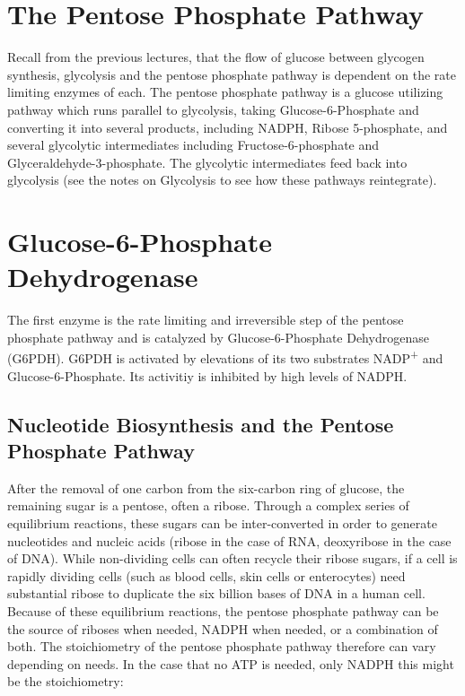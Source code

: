 \documentclass{tufte-handout}
\begin{document}
\section{The Pentose Phosphate Pathway}

Recall from the previous lectures, that the flow of glucose between glycogen synthesis, glycolysis and the pentose phosphate pathway is dependent on the rate limiting enzymes of each.  The pentose phosphate pathway is a glucose utilizing pathway which runs parallel to glycolysis, taking Glucose-6-Phosphate and converting it into several products, including NADPH, Ribose 5-phosphate, and several glycolytic intermediates including Fructose-6-phosphate and Glyceraldehyde-3-phosphate.  The glycolytic intermediates feed back into glycolysis (see the notes on Glycolysis to see how these pathways reintegrate).

\section{Glucose-6-Phosphate Dehydrogenase}

The first enzyme is the rate limiting and irreversible step of the pentose phosphate pathway and is catalyzed by Glucose-6-Phosphate Dehydrogenase (G6PDH).  G6PDH is activated by elevations of its two substrates NADP\textsuperscript{+} and Glucose-6-Phosphate.  Its activitiy is inhibited by high levels of NADPH.  

\subsection{Nucleotide Biosynthesis and the Pentose Phosphate Pathway}
After the removal of one carbon from the six-carbon ring of glucose, the remaining sugar is a pentose, often a ribose.  Through a complex series of equilibrium reactions, these sugars can be inter-converted in order to generate nucleotides and nucleic acids (ribose in the case of RNA, deoxyribose in the case of DNA).  While non-dividing cells can often recycle their ribose sugars, if a cell is rapidly dividing cells (such as blood cells, skin cells or enterocytes) need substantial ribose to duplicate the six billion bases of DNA in a human cell.  Because of these equilibrium reactions, the pentose phosphate pathway can be the source of riboses when needed, NADPH when needed, or a combination of both.  The stoichiometry of the pentose phosphate pathway therefore can vary depending on needs.  In the case that no ATP is needed, only NADPH this might be the stoichiometry:
\end{document}
